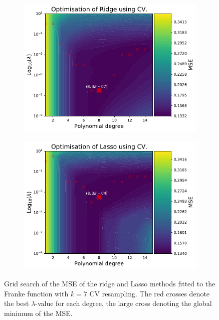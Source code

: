 \documentclass[twocolumn,english,notitlepage]{article}
\begin{document}
        \begin{figure}[ht]
            \begin{subfigure}{\linewidth}
                \centering
                \includegraphics[width=\linewidth]{heatmap_ridge.pdf}
            \end{subfigure}
            \begin{subfigure}{\linewidth}
                \centering
                \includegraphics[width=\linewidth]{heatmap_lasso.pdf}
            \end{subfigure}
            \caption{Grid search of the MSE of the ridge and Lasso methods fitted to the Franke function with $k=7$ CV resampling. The red crosses denote the best $\lambda$-value for each degree, the large cross denoting the global minimum of the MSE.}
            \label{fig:res:Franke_heatmaps}
        \end{figure}
\end{document}
